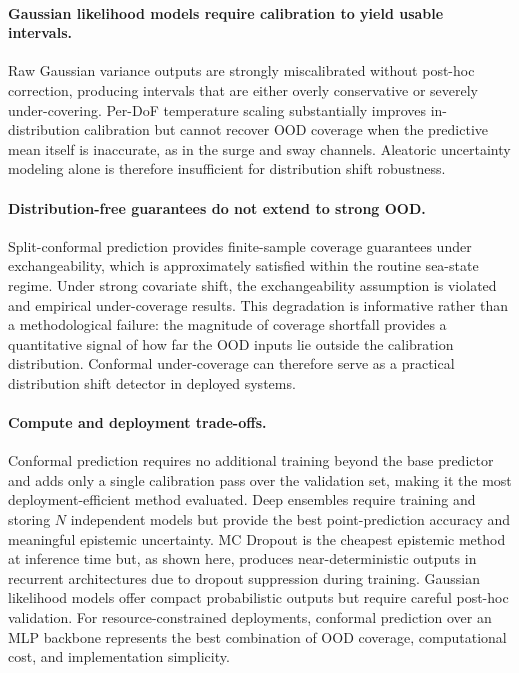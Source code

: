 \documentclass[a4paper,fleqn]{cas-sc}
\begin{document}
\paragraph{Gaussian likelihood models require calibration to yield usable intervals.}
Raw Gaussian variance outputs are strongly miscalibrated without post-hoc correction, producing intervals that are either overly conservative or severely under-covering. Per-DoF temperature scaling substantially improves in-distribution calibration but cannot recover OOD coverage when the predictive mean itself is inaccurate, as in the surge and sway channels. Aleatoric uncertainty modeling alone is therefore insufficient for distribution shift robustness.

\paragraph{Distribution-free guarantees do not extend to strong OOD.}
Split-conformal prediction provides finite-sample coverage guarantees under exchangeability, which is approximately satisfied within the routine sea-state regime. Under strong covariate shift, the exchangeability assumption is violated and empirical under-coverage results. This degradation is informative rather than a methodological failure: the magnitude of coverage shortfall provides a quantitative signal of how far the OOD inputs lie outside the calibration distribution. Conformal under-coverage can therefore serve as a practical distribution shift detector in deployed systems.

\paragraph{Compute and deployment trade-offs.}
Conformal prediction requires no additional training beyond the base predictor and adds only a single calibration pass over the validation set, making it the most deployment-efficient method evaluated. Deep ensembles require training and storing $N$ independent models but provide the best point-prediction accuracy and meaningful epistemic uncertainty. MC Dropout is the cheapest epistemic method at inference time but, as shown here, produces near-deterministic outputs in recurrent architectures due to dropout suppression during training. Gaussian likelihood models offer compact probabilistic outputs but require careful post-hoc validation. For resource-constrained deployments, conformal prediction over an MLP backbone represents the best combination of OOD coverage, computational cost, and implementation simplicity.
\end{document}
